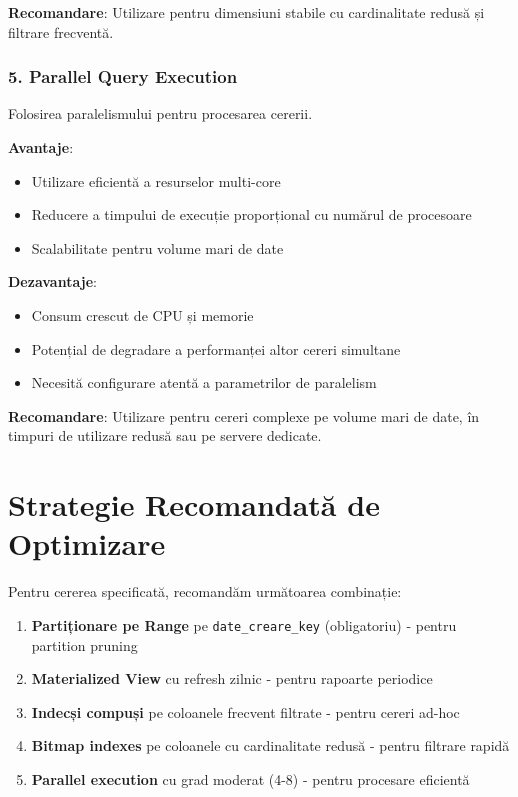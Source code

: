 \textbf{Recomandare}: Utilizare pentru dimensiuni stabile cu cardinalitate redusă și filtrare frecventă.

\subsubsection{5. Parallel Query Execution}

Folosirea paralelismului pentru procesarea cererii.

\textbf{Avantaje}:
\begin{itemize}
    \item Utilizare eficientă a resurselor multi-core
    \item Reducere a timpului de execuție proporțional cu numărul de procesoare
    \item Scalabilitate pentru volume mari de date
\end{itemize}

\textbf{Dezavantaje}:
\begin{itemize}
    \item Consum crescut de CPU și memorie
    \item Potențial de degradare a performanței altor cereri simultane
    \item Necesită configurare atentă a parametrilor de paralelism
\end{itemize}

\textbf{Recomandare}: Utilizare pentru cereri complexe pe volume mari de date, în timpuri de utilizare redusă sau pe servere dedicate.

\section{Strategie Recomandată de Optimizare}

Pentru cererea specificată, recomandăm următoarea combinație:

\begin{enumerate}
    \item \textbf{Partiționare pe Range} pe \texttt{date\_creare\_key} (obligatoriu) - pentru partition pruning
    \item \textbf{Materialized View} cu refresh zilnic - pentru rapoarte periodice
    \item \textbf{Indecși compuși} pe coloanele frecvent filtrate - pentru cereri ad-hoc
    \item \textbf{Bitmap indexes} pe coloanele cu cardinalitate redusă - pentru filtrare rapidă
    \item \textbf{Parallel execution} cu grad moderat (4-8) - pentru procesare eficientă
\end{enumerate}

